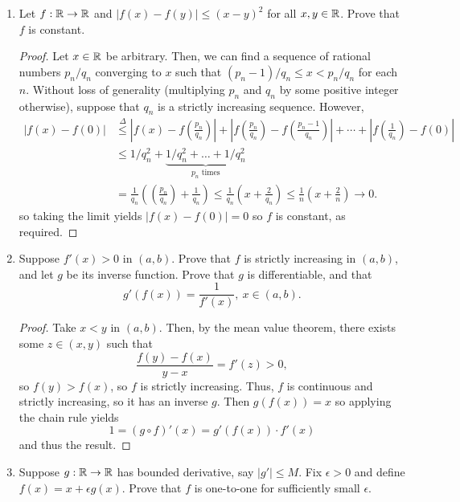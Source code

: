 \begin{enumerate}[1.]
\item %
Let $f: \mathbb{R} \rightarrow \mathbb{R}$ and $|f(x) - f(y)| \le (x - y)^2$ for all $x, y \in \mathbb{R}$. Prove that $f$ is constant.

\begin{proof}
    Let $x \in \mathbb{R}$ be arbitrary. Then, we can find a sequence of rational numbers $p_n/q_n$ converging to $x$ such that $(p_n-1)/q_n \le x < p_n/q_n$ for each $n$. Without loss of generality (multiplying $p_n$ and $q_n$ by some positive integer otherwise), suppose that $q_n$ is a strictly increasing sequence. However,
    \begin{align*}
        |f(x) - f(0)| &\overset{\Delta}{\le} \left|f(x) - f\left(\frac{p_n}{q_n}\right)\right| + \left|f\left(\frac{p_n}{q_n}\right) - f\left(\frac{p_n-1}{q_n}\right)\right| + \dotsb + \left|f\left(\frac{1}{q_n}\right) - f(0)\right| \\
            &\le 1/q_n^2 + \underbrace{1/q_n^2 + \dotsc + 1/q_n^2}_{p_n \text{ times}} \\
            &= \frac{1}{q_n} \left(\left(\frac{p_n}{q_n}\right) + \frac{1}{q_n} \right) \le \frac{1}{q_n} \left(x + \frac{2}{q_n}\right) \le \frac{1}{n} \left(x + \frac{2}{n} \right) \to 0. 
    \end{align*}
    so taking the limit yields $|f(x) - f(0)| = 0$ so $f$ is constant, as required.
\end{proof}

\item %
    Suppose $f'(x) > 0$ in $(a, b)$. Prove that $f$ is strictly increasing in $(a, b)$, and let $g$ be its inverse function. Prove that $g$ is differentiable, and that
    \[
        g'(f(x)) = \frac{1}{f'(x)},\ x \in (a, b).
    \]
    
    \begin{proof}
        Take $x < y$ in $(a, b)$. Then, by the mean value theorem, there exists some $z \in (x, y)$ such that
        \[
            \frac{f(y) - f(x)}{y - x} = f'(z) > 0,
        \]
        so $f(y) > f(x)$, so $f$ is strictly increasing. Thus, $f$ is continuous and strictly increasing, so it has an inverse $g$. Then $g(f(x)) = x$ so applying the chain rule yields
        \[
            1 = (g \circ f)'(x) = g'(f(x)) \cdot f'(x)
        \]
        and thus the result.
    \end{proof}

\item %
    Suppose $g: \mathbb{R} \rightarrow \mathbb{R}$ has bounded derivative, say $|g'| \le M$. Fix $\epsilon > 0$ and define $f(x) = x + \epsilon g(x)$. Prove that $f$ is one-to-one for sufficiently small $\epsilon$.
    

\end{enumerate}

